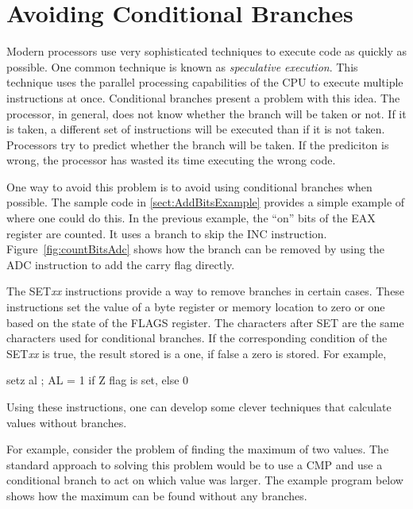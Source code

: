 \section{Avoiding Conditional Branches}

Modern processors use very sophisticated techniques to execute code as
quickly as possible. One common technique is known as
\emph{speculative execution}. This
technique uses the parallel processing capabilities of the CPU to
execute multiple instructions at once. Conditional branches present a
problem with this idea. The processor, in general, does not know
whether the branch will be taken or not. If it is taken, a different
set of instructions will be executed than if it is not
taken. Processors try to predict whether the branch will be taken. If
the prediciton is wrong, the processor has wasted its time executing
the wrong code.


One way to avoid this problem is to avoid using conditional branches
when possible. The sample code in \ref{sect:AddBitsExample} provides a
simple example of where one could do this. In the previous example, the
``on'' bits of the EAX register are counted. It uses a branch to skip
the {\code INC} instruction. Figure~\ref{fig:countBitsAdc} shows how
the branch can be removed by using the {\code ADC}
instruction to add the carry flag directly.

The {\code SET\emph{xx}} instructions provide a
way to remove branches in certain cases. These instructions set the
value of a byte register or memory location to zero or one based on
the state of the FLAGS register.  The characters after {\code SET} are
the same characters used for conditional branches. If the
corresponding condition of the {\code SET\emph{xx}} is true, the result stored
is a one, if false a zero is stored. For example,
\begin{AsmCodeListing}[frame=none,numbers=none]
      setz   al        ; AL = 1 if Z flag is set, else 0
\end{AsmCodeListing}
Using these instructions, one can develop some clever techniques that
calculate values without branches.

For example, consider the problem of finding the maximum of two values.
The standard approach to solving this problem would be to use a {\code
CMP} and use a conditional branch to act on which value was larger. The
example program below shows how the maximum can be found without any 
branches.

